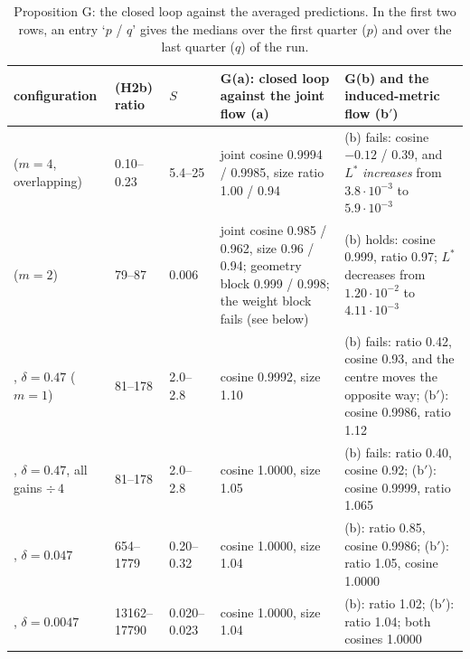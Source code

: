 \begin{table}[htbp]
\centering
\footnotesize
\begin{tabularx}{\textwidth}{@{}>{\raggedright\arraybackslash}p{2.35cm}llYY@{}}
\toprule
configuration & (H2b) ratio & $S$ & G(a): closed loop against the joint flow (a) & G(b) and the induced-metric flow
(b$'$)\\
\midrule
{} ($m = 4$, overlapping) & 0.10--0.23 & 5.4--25 &
joint cosine 0.9994 / 0.9985, size ratio 1.00 / 0.94 &
(b) fails: cosine $-0.12$ / 0.39, and $L^*$ \emph{increases} from $3.8\cdot10^{-3}$ to $5.9\cdot10^{-3}$\\
\addlinespace
{} ($m = 2$) & 79--87 & 0.006 &
joint cosine 0.985 / 0.962, size 0.96 / 0.94; geometry block 0.999 / 0.998; the weight block fails (see below) &
(b) holds: cosine 0.999, ratio 0.97; $L^*$ decreases from $1.20\cdot10^{-2}$ to $4.11\cdot10^{-3}$\\
\addlinespace
{}, $\delta = 0.47$ ($m = 1$) & 81--178 & 2.0--2.8 &
cosine 0.9992, size 1.10 &
(b) fails: ratio 0.42, cosine 0.93, and the centre moves the opposite way; (b$'$): cosine 0.9986, ratio 1.12\\
\addlinespace
{}, $\delta = 0.47$, all gains $\div\,4$ & 81--178 & 2.0--2.8 &
cosine 1.0000, size 1.05 &
(b) fails: ratio 0.40, cosine 0.92; (b$'$): cosine 0.9999, ratio 1.065\\
\addlinespace
{}, $\delta = 0.047$ & 654--1779 & 0.20--0.32 &
cosine 1.0000, size 1.04 &
(b): ratio 0.85, cosine 0.9986; (b$'$): ratio 1.05, cosine 1.0000\\
\addlinespace
{}, $\delta = 0.0047$ & 13162--17790 & 0.020--0.023 &
cosine 1.0000, size 1.04 &
(b): ratio 1.02; (b$'$): ratio 1.04; both cosines 1.0000\\
\bottomrule
\end{tabularx}
\caption{Proposition G: the closed loop against the averaged predictions. In the first two rows, an entry
`$p$ / $q$' gives the medians over the first quarter ($p$) and over the last quarter ($q$) of the run.}
\label{tab:propG:numerics}
\end{table}

